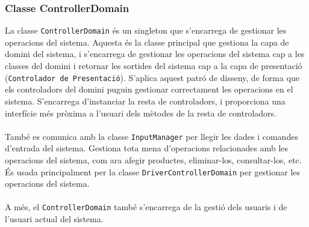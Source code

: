 \documentclass[a4paper, t]{article}
\begin{document}
\subsubsection{Classe ControllerDomain}
La classe \texttt{ControllerDomain} és un singleton que s’encarrega de gestionar les operacions del sistema. 
Aquesta és la classe principal que gestiona la capa de domini del sistema, i s’encarrega de gestionar les 
operacions del sistema cap a les classes del domini i retornar les sortides del sistema cap a la capa de presentació 
(\texttt{Controlador de Presentació}). S’aplica aquest patró de disseny, de forma que els controladors del domini puguin 
gestionar correctament les operacions en el sistema. S’encarrega d’instanciar la resta de controladors, i proporciona una 
interfície més pròxima a l’usuari dels mètodes de la resta de controladors. 
\\ \\
\noindent També es comunica amb la classe \texttt{InputManager} per llegir les dades i comandes d’entrada del sistema. 
Gestiona tota mena d’operacions relacionades amb les operacions del sistema, com ara afegir productes, eliminar-los, consultar-los, etc. 
És usada principalment per la classe \texttt{DriverControllerDomain} per gestionar les operacions del sistema.
\\ \\
\noindent A més, el \texttt{ControllerDomain} també s'encarrega de la gestió dels usuaris i de l'usuari actual del sistema.
\end{document}
